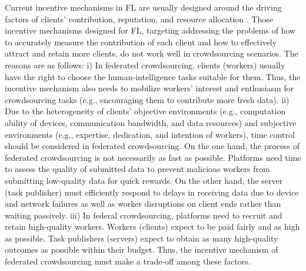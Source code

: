 \documentclass[final,1p,times]{elsarticle}
\begin{document}
Current incentive mechanisms in FL are usually designed around the driving factors of clients’ contribution, reputation, and resource allocation \citep{zhan2020learning,zhan2021survey}. Those incentive mechanisms designed for FL, targeting addressing the problems of how to accurately measure the contribution of each client and how to effectively attract and retain more clients, do not work well in crowdsourcing scenarios. The reasons are as follows: i) In federated crowdsourcing, clients (workers) usually have the right to choose the human-intelligence tasks suitable for them. Thus, the incentive mechanism also needs to mobilize workers' interest and enthusiasm for crowdsourcing tasks (e.g., encouraging them to contribute more fresh data). ii) Due to the heterogeneity of clients' objective environments (e.g., computation ability of devices, communication bandwidth, and data resources) and subjective environments (e.g., expertise, dedication, and intention of workers), time control should be considered in federated crowdsourcing. On the one hand, the process of federated crowdsourcing is not necessarily as fast as possible. Platforms need time to assess the quality of submitted data to prevent malicious workers from submitting low-quality data for quick rewards. On the other hand, the server (task publisher) must efficiently respond to delays in receiving data due to device and network failures as well as worker disruptions on client ends rather than waiting passively. iii) In federal crowdsourcing, platforms need to recruit and retain high-quality workers. Workers (clients) expect to be paid fairly and as high as possible. Task publishers (servers) expect to obtain as many high-quality outcomes as possible within their budget. Thus, the incentive mechanism of federated crowdsourcing must make a trade-off among these factors.
\end{document}
